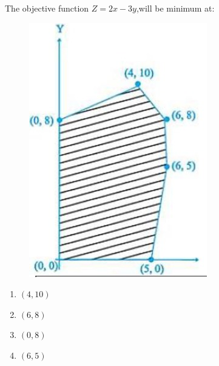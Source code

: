 \documentclass{article}
\begin{document}
\begin{enumerate}
The objective function 
$Z=2x-3y$,will be minimum at:\\
\begin{figure}[h]
    \centering{}
    \includegraphics[width=\columnwidth]{Figs/Fig2.jpg}
    \caption{}
    \label{Fig2}                                        \end{figure}
\begin{enumerate}
    \item $(4,10)$
    \item $(6,8)$
    \item $(0,8)$
    \item $(6,5)$
    \end{enumerate}
    
\end{enumerate}
\end{document}
